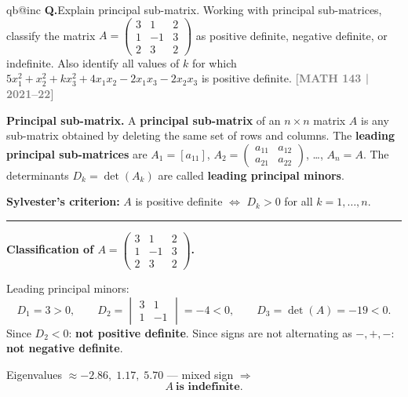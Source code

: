 \documentclass[12pt,a3paper]{article}
\makeatletter
\newcommand{\yr}[1]{\hfill\textcolor{gray}{\small\textbf{[#1]}}}
\newcounter{qnum}
\newcommand{\Q}[1]{%
  \csname qb@inc\endcsname
  \needspace{4\baselineskip}
  \refstepcounter{qnum}
  \vspace{6pt}
  \noindent\textbf{Q\theqnum.}\enspace #1\par
}
\makeatother
\begin{document}
\Q{Explain principal sub-matrix. Working with principal sub-matrices, classify the matrix $A = \begin{pmatrix} 3 & 1 & 2 \\ 1 & -1 & 3 \\ 2 & 3 & 2 \end{pmatrix}$ as positive definite, negative definite, or indefinite. Also identify all values of $k$ for which $5x_1^2 + x_2^2 + kx_3^2 + 4x_1x_2 - 2x_1x_3 - 2x_2x_3$ is positive definite.
\yr{MATH 143 | 2021--22}}


\begin{tcolorbox}[enhanced,breakable,
  colback=cE!4,colframe=cE,boxrule=0.8pt,arc=5pt,
  title={\textbf{Answer --- Principal Sub-matrices; Classify $A$; Find $k$}},
  fonttitle=\bfseries\color{white},colbacktitle=cE]

\textbf{Principal sub-matrix.} A \textbf{principal sub-matrix} of an $n\times n$ matrix $A$
is any sub-matrix obtained by deleting the same set of rows and columns.
The \textbf{leading principal sub-matrices} are $A_1=[a_{11}]$,
$A_2=\begin{pmatrix}a_{11}&a_{12}\\a_{21}&a_{22}\end{pmatrix}$, \ldots, $A_n=A$.
The determinants $D_k=\det(A_k)$ are called \textbf{leading principal minors}.

\textbf{Sylvester's criterion:}
$A$ is positive definite $\Leftrightarrow$ $D_k>0$ for all $k=1,\ldots,n$.

\medskip\textcolor{cE}{\rule{\textwidth}{0.4pt}}

\textbf{Classification of $A=\begin{pmatrix}3&1&2\\1&-1&3\\2&3&2\end{pmatrix}$.}

Leading principal minors:
\[
  D_1=3>0,\qquad D_2=\begin{vmatrix}3&1\\1&-1\end{vmatrix}=-4<0,\qquad D_3=\det(A)=-19<0.
\]
Since $D_2<0$: \textbf{not positive definite}. Since signs are not alternating as
$-,+,-$: \textbf{not negative definite}.

Eigenvalues $\approx-2.86,\;1.17,\;5.70$ — mixed sign $\Rightarrow$
\[
  \boxed{A\ \textbf{is indefinite}.}
\]


\end{tcolorbox}
\end{document}
